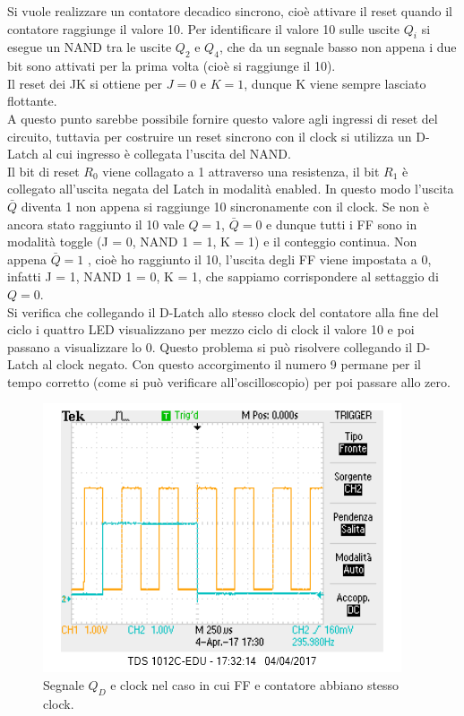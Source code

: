 \documentclass[10pt,a4paper]{article}
\begin{document}
Si vuole realizzare un contatore decadico sincrono, cioè attivare il reset quando il contatore raggiunge il valore 10. Per identificare il valore 10 sulle uscite $Q_i$ si esegue un NAND tra le uscite $Q_2$ e $Q_4$, che da un segnale basso non appena i due bit sono attivati per la prima volta (cioè si raggiunge il 10). \\
Il reset dei JK si ottiene per $J = 0$ e $K = 1$, dunque K viene sempre lasciato flottante.\\
A questo punto sarebbe possibile fornire questo valore agli ingressi di reset del circuito, tuttavia per costruire un reset sincrono con il clock si utilizza un D-Latch al cui ingresso è collegata l'uscita del NAND.\\
Il bit di reset $R_0$ viene collagato a 1 attraverso una resistenza, il bit $R_1$ è collegato all'uscita negata del Latch in modalità enabled. In questo modo l'uscita $\bar{Q}$ diventa 1 non appena si raggiunge 10 sincronamente con il clock.
Se non è ancora stato raggiunto il 10 vale $Q = 1$, $\bar{Q} = 0$ e dunque tutti i FF sono in modalità toggle (J = 0, NAND 1 = 1, K = 1) e il conteggio continua. Non appena $\bar{Q} = 1$ , cioè ho raggiunto il 10, l'uscita degli FF viene impostata a 0, infatti J = 1, NAND 1 = 0, K = 1, che sappiamo corrispondere al settaggio di $Q = 0$.\\
Si verifica che collegando il D-Latch allo stesso clock del contatore alla fine del ciclo i quattro LED visualizzano per mezzo ciclo di clock il valore 10 e poi passano a visualizzare lo 0. Questo problema si può risolvere collegando il D-Latch al clock negato. Con questo accorgimento il numero 9 permane per il tempo corretto (come si può verificare all'oscilloscopio) per poi passare allo zero.\\


\begin{figure}[!htb]
\centering
\includegraphics[scale=1.0]{clocksbagliato.png}
\caption{Segnale $Q_D$ e clock nel caso in cui FF e contatore abbiano stesso clock.\label{sbagliato}}
\end{figure}
\end{document}
